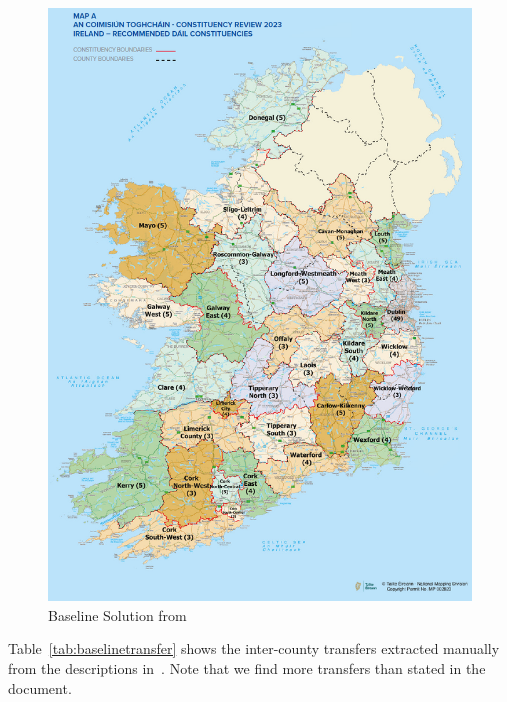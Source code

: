\documentclass[runningheads]{llncs}
\begin{document}
\begin{figure}[htbp]
\caption{\label{fig:baseline} Baseline Solution from~\cite{ElectoralCommission2023}}
\includegraphics[width=\textwidth]{images/baseline}
\end{figure}

Table~\ref{tab:baselinetransfer} shows the inter-county transfers extracted manually from the descriptions in~\cite{ElectoralCommission2023}. Note that we find more transfers than stated in the document.
\end{document}
